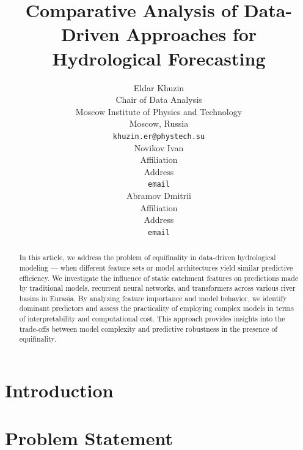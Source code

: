 \documentclass{article}
\title{Comparative Analysis of Data-Driven Approaches for Hydrological Forecasting}
\author{
    Eldar Khuzin \\
    Chair of Data Analysis\\
    Moscow Institute of Physics and Technology\\
    Moscow, Russia \\
    \texttt{khuzin.er@phystech.su} \\
    \And
    Novikov Ivan \\
    Affiliation \\
    Address \\
    \texttt{email} \\
    \AND
    Abramov Dmitrii \\
    Affiliation \\
    Address \\
    \texttt{email}
}
\date{}
\begin{document}
\sloppy
\justifying

\maketitle

\begin{abstract}
    In this article, we address the problem of equifinality in data-driven hydrological modeling — when different feature sets or model architectures yield similar predictive efficiency. We investigate the influence of static catchment features on predictions made by traditional models, recurrent neural networks, and transformers across various river basins in Eurasia. By analyzing feature importance and model behavior, we identify dominant predictors and assess the practicality of employing complex models in terms of interpretability and computational cost. This approach provides insights into the trade-offs between model complexity and predictive robustness in the presence of equifinality.
\end{abstract}




\section{Introduction}
\label{sec:introduction}


\section{Problem Statement}
\label{sec:problem-statement}
\end{document}
